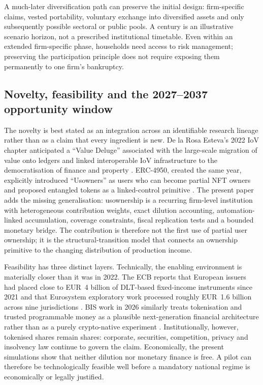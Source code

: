 A much-later diversification path can preserve the initial design: firm-specific claims, vested portability, voluntary exchange into diversified assets and only subsequently possible sectoral or public pools. A century is an illustrative scenario horizon, not a prescribed institutional timetable. Even within an extended firm-specific phase, households need access to risk management; preserving the participation principle does not require exposing them permanently to one firm's bankruptcy.

\subsection{Novelty, feasibility and the 2027--2037 opportunity window}
The novelty is best stated as an integration across an identifiable research lineage rather than as a claim that every ingredient is new. De la Rosa Esteva's 2022 IoV chapter anticipated a ``Value Deluge'' associated with the large-scale migration of value onto ledgers and linked interoperable IoV infrastructure to the democratisation of finance and property \citep{delarosa2022iov}. ERC-4950, created the same year, explicitly introduced ``Usowners'' as users who can become partial NFT owners and proposed entangled tokens as a linked-control primitive \citep{erc4950}. The present paper adds the missing generalisation: usownership is a recurring firm-level institution with heterogeneous contribution weights, exact dilution accounting, automation-linked accumulation, coverage constraints, fiscal replication tests and a bounded monetary bridge. The contribution is therefore not the first use of partial user ownership; it is the structural-transition model that connects an ownership primitive to the changing distribution of production income.

Feasibility has three distinct layers. Technically, the enabling environment is materially closer than it was in 2022. The ECB reports that European issuers had placed close to EUR~4 billion of DLT-based fixed-income instruments since 2021 and that Eurosystem exploratory work processed roughly EUR~1.6 billion across nine jurisdictions \citep{cipollone2026}. BIS work in 2026 similarly treats tokenisation and trusted programmable money as a plausible next-generation financial architecture rather than as a purely crypto-native experiment \citep{bis2026}. Institutionally, however, tokenised shares remain shares: corporate, securities, competition, privacy and insolvency law continue to govern the claim. Economically, the present simulations show that neither dilution nor monetary finance is free. A pilot can therefore be technologically feasible well before a mandatory national regime is economically or legally justified.

